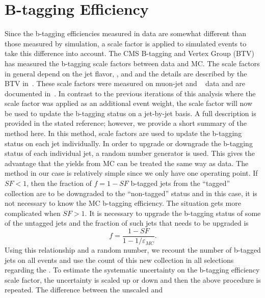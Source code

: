 \section{B-tagging Efficiency}
\label {sec:eff_btag}
Since the b-tagging efficiencies measured in data are somewhat different than
those measured by simulation, a scale factor is applied to simulated events to
take this difference into account. The CMS B-tagging and Vertex Group (BTV) has
measured the b-tagging scale factors between data and MC. The scale factors in
general depend on the jet flavor, \pt, and \aeta and the details are described
by the BTV in~\cite{beff_2012,btvtwiki}. These scale factors were measured on
muon-jet and \ttbar~ data and are documented in~\cite{btvtwiki}. In contrast to
the previous iterations of this analysis where the scale factor was applied as
an additional event weight, the scale factor will now be used to update the
b-tagging status on a jet-by-jet basis. A full description is provided in the
stated reference; however, we provide a short summary of the method here. In
this method, scale factors are used to update the b-tagging status on each jet
individually. In order to upgrade or downgrade the b-tagging status of each
individual jet, a random number generator is used. This gives the advantage
that the yields from MC can be treated the same way as data. The method in our
case is relatively simple since we only have one operating point. If $SF < 1$,
then the fraction of $f = 1 - SF$ b-tagged jets from the ``tagged'' collection
are to be downgraded to the ``non-tagged'' status and in this case, it is
not necessary to know the MC b-tagging efficiency. The situation gets more
complicated when $SF > 1$. It is necessary to upgrade the b-tagging status of
some of the untagged jets and the fraction of such jets that needs to be upgraded
is
\[
  f = \frac{1 - SF}{1 - 1/\varepsilon_{MC}}.
\]
Using this relationship and a random number, we recount the number of b-tagged
jets on all events and use the count of this new collection in all selections
regarding the \nbtags. To estimate the systematic uncertainty on the b-tagging
efficiency scale factor, the uncertainty is scaled up or down and then
the above procedure is repeated. The difference between the unscaled and
